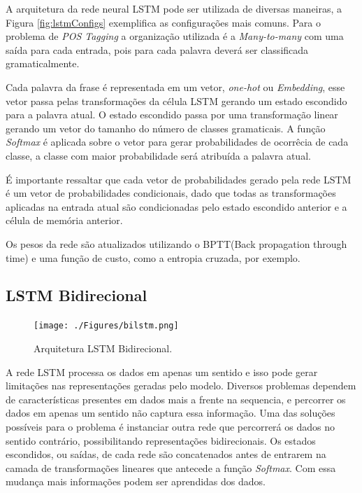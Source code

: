 \documentclass[11pt]{scrartcl} %
\begin{document}
A arquitetura da rede neural LSTM pode ser utilizada de diversas maneiras, a Figura \ref{fig:lstmConfigs} exemplifica as configurações mais comuns. Para o problema de \textit{POS Tagging} a organização utilizada é a \textit{Many-to-many} com uma saída para cada entrada, pois para cada palavra deverá ser classificada gramaticalmente.

Cada palavra da frase é representada em um vetor, \textit{one-hot} ou \textit{Embedding}, esse vetor passa pelas transformações da célula LSTM gerando um estado escondido para a palavra atual. O estado escondido passa por uma transformação linear gerando um vetor do tamanho do número de classes gramaticais. A função \textit{Softmax} é aplicada sobre o vetor para gerar probabilidades de ocorrêcia de cada classe, a classe com maior probabilidade será atribuída a palavra atual. 

É importante ressaltar que cada vetor de probabilidades gerado pela rede LSTM é um vetor de probabilidades condicionais, dado que todas as transformações aplicadas na entrada atual são condicionadas pelo estado escondido anterior e a célula de memória anterior.

Os pesos da rede são atualizados utilizando o BPTT(Back propagation through time) e uma função de custo, como a entropia cruzada, por exemplo.

\subsection{LSTM Bidirecional}
	
\begin{figure}[H] %
	\centering
	\texttt{[image: ./Figures/bilstm.png]} %
	\caption{Arquitetura LSTM Bidirecional.}
	\label{fig:bilstm}
\end{figure}
	
A rede LSTM processa os dados em apenas um sentido e isso pode gerar limitações nas representações geradas pelo modelo. Diversos problemas dependem de características presentes em dados mais a frente na sequencia, e percorrer os dados em apenas um sentido não captura essa informação. Uma das soluções possíveis para o problema é instanciar outra rede que percorrerá os dados no sentido contrário, possibilitando representações bidirecionais. Os estados escondidos, ou saídas, de cada rede são concatenados antes de entrarem na camada de transformações lineares que antecede a função \textit{Softmax}. Com essa mudança mais informações podem ser aprendidas dos dados.
	
\end{document}
